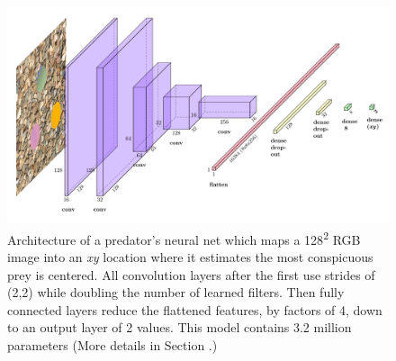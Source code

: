 \documentclass[letterpaper]{article}
\begin{document}
\begin{figure}[t!]
    \includegraphics[width=\columnwidth]{predator_cnn.pdf}
    \caption{Architecture of a predator's neural net which maps a 128\textsuperscript{2} RGB image into an \textit{xy} location where it estimates the most conspicuous prey is centered. All convolution layers after the first use strides of (2,2) while doubling the number of learned filters. Then fully connected layers reduce the flattened features, by factors of 4, down to an output layer of 2 values. This model contains 3.2 million parameters (More details in Section .)}
    \label{fig:predator_cnn}
\end{figure}

\end{document}
